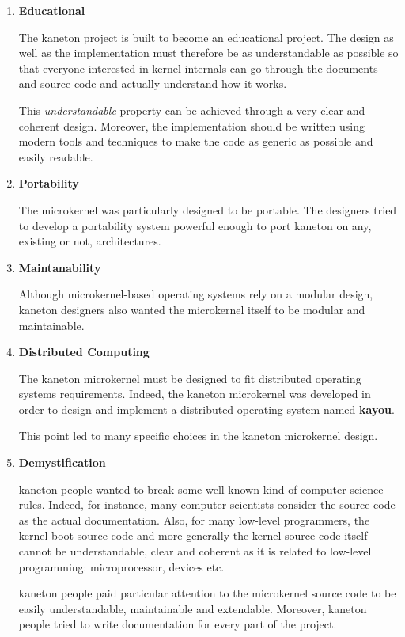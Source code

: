 \begin{enumerate}
  \item
    \textbf{Educational}

    \-

    The kaneton project is built to become an educational project. The design
    as well as the implementation must therefore be as understandable as
    possible so that everyone interested in kernel internals can go through the
    documents and source code and actually understand how it works.

    \-

    This \textit{understandable} property can be achieved through a very clear
    and coherent design. Moreover, the implementation should be written using
    modern tools and techniques to make the code as generic as possible and
    easily readable.
  \item
    \textbf{Portability}

    \-

    The microkernel was particularly designed to be portable. The designers
    tried to develop a portability system powerful enough to port kaneton on
    any, existing or not, architectures.
  \item
    \textbf{Maintanability}

    \-

    Although microkernel-based operating systems rely on a modular design,
    kaneton designers also wanted the microkernel itself to be modular and
    maintainable.
  \item
    \textbf{Distributed Computing}

    \-

    The kaneton microkernel must be designed to fit distributed operating
    systems requirements. Indeed, the kaneton microkernel was developed in
    order to design and implement a distributed operating system named
    \textbf{kayou}.

    \-

    This point led to many specific choices in the kaneton microkernel design.
  \item
    \textbf{Demystification}

    \-

    kaneton people wanted to break some well-known kind of computer
    science rules. Indeed, for instance, many computer scientists consider
    the source code as the actual documentation. Also, for many low-level
    programmers, the kernel boot source code and more generally the
    kernel source code itself cannot be understandable, clear and coherent as
    it is related to low-level programming: microprocessor, devices etc.

    kaneton people paid particular attention to the microkernel source code to
    be easily understandable, maintainable and extendable. Moreover, kaneton
    people tried to write documentation for every part of the project.
\end{enumerate}

